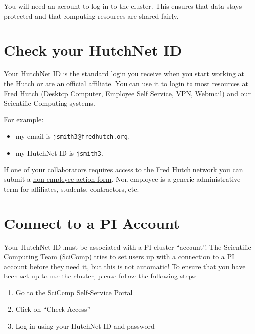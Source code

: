 \documentclass[
]{book}
\providecommand{\tightlist}{%
  \setlength{\itemsep}{0pt}\setlength{\parskip}{0pt}}
\begin{document}
You will need an account to log in to the cluster. This ensures that data stays protected and that computing resources are shared fairly.

\hypertarget{check-your-hutchnet-id}{%
\section{Check your HutchNet ID}\label{check-your-hutchnet-id}}

Your \href{https://centernet.fredhutch.org/cn/u/center-it/help-desk.html}{HutchNet ID} is the standard login you receive when you start working at the Hutch or are an official affiliate. You can use it to login to most resources at Fred Hutch (Desktop Computer, Employee Self Service, VPN, Webmail) and our Scientific Computing systems.

For example:

\begin{itemize}
\tightlist
\item
  my email is \texttt{jsmith3@fredhutch.org}.\\
\item
  my HutchNet ID is \texttt{jsmith3}.
\end{itemize}

If one of your collaborators requires access to the Fred Hutch network you can submit a \href{https://centernet.fredhutch.org/cn/f/hr/lcex/non-employee-action-form.html}{non-employee action form}. Non-employee is a generic administrative term for affiliates, students, contractors, etc.

\hypertarget{pi-account}{%
\section{Connect to a PI Account}\label{pi-account}}

Your HutchNet ID must be associated with a PI cluster ``account''. The Scientific Computing Team (SciComp) tries to set users up with a connection to a PI account before they need it, but this is not automatic! To ensure that you have been set up to use the cluster, please follow the following steps:

\begin{enumerate}
\def\labelenumi{\arabic{enumi}.}
\tightlist
\item
  Go to the \href{https://scicomp-self-service.fredhutch.org/}{SciComp Self-Service Portal}
\item
  Click on ``Check Access''
\item
  Log in using your HutchNet ID and password
\end{enumerate}
\end{document}
